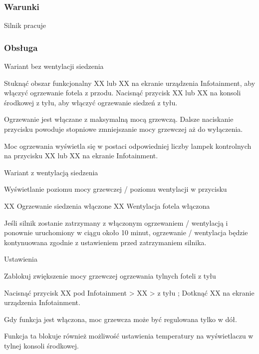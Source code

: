 \subsubsection{Warunki}
\begin{itemizeTick}
	\itemTick Silnik pracuje
\end{itemizeTick}

\subsubsection{Obsługa}

Wariant bez wentylacji siedzenia

\begin{itemizeArrow}
	\itemArrow Stuknąć obszar funkcjonalny XX lub XX na ekranie urządzenia Infotainment, aby włączyć ogrzewanie fotela z przodu.
	\itemArrow Nacisnąć przycisk XX lub XX na konsoli środkowej z tyłu, aby włączyć ogrzewanie siedzeń z tyłu.
\end{itemizeArrow}

Ogrzewanie jest włączane z maksymalną mocą grzewczą. Dalsze naciskanie przycisku powoduje stopniowe zmniejszanie mocy grzewczej aż do wyłączenia.

Moc ogrzewania wyświetla się w postaci odpowiedniej liczby lampek kontrolnych na przycisku XX lub XX na ekranie Infotainment.

Wariant z wentylacją siedzenia

Wyświetlanie poziomu mocy grzewczej / poziomu wentylacji w przycisku

XX Ogrzewanie siedzenia włączone
XX Wentylacja fotela włączona

Jeśli silnik zostanie zatrzymany z włączonym ogrzewaniem / wentylacją i ponownie uruchomiony w ciągu około 10 minut, ogrzewanie / wentylacja będzie kontynuowana zgodnie z ustawieniem przed zatrzymaniem silnika.

Ustawienia

Zablokuj zwiększenie mocy grzewczej ogrzewania tylnych foteli z tyłu

\begin{itemizeArrow}
	\itemArrow Nacisnąć przycisk XX pod Infotainment > XX > z tyłu ; Dotknąć XX na ekranie urządzenia Infotainment.
\end{itemizeArrow}

Gdy funkcja jest włączona, moc grzewcza może być regulowana tylko w dół.

Funkcja ta blokuje również możliwość ustawienia temperatury na wyświetlaczu w tylnej konsoli środkowej.


